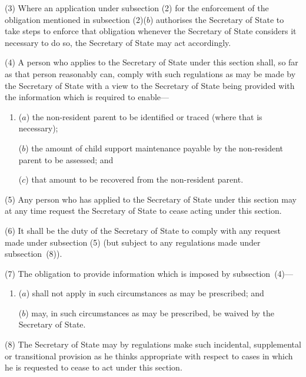 \documentclass[a4paper]{article}
\begin{document}
(3)
Where an application under subsection (2) for the enforcement of the
obligation mentioned in subsection (2)($b$) authorises the Secretary of State to take
steps to enforce that obligation whenever the Secretary of State considers it
necessary to do so, the Secretary of State may act accordingly.

(4)
A person who applies to the Secretary of State under this section shall, so
far as that person reasonably can, comply with such regulations as may be made
by the Secretary of State with a view to the Secretary of State being provided
with the information which is required to enable---

\begin{enumerate}\item[]
($a$)
the non-resident parent
to be identified or 
traced (where
that is necessary);

($b$)
the amount of child support maintenance payable by the non-resident parent
to be assessed; and

($c$)
that amount to be recovered from the non-resident parent.
\end{enumerate}

(5)
Any person who has applied to the Secretary of State under this section may
at any time request the Secretary of State to cease acting under this section.

(6)
It shall be the duty of the Secretary of State to comply with any request
made under subsection (5) (but subject to any regulations made under subsection~(8)).

(7)
The obligation to provide information which is imposed by subsection~(4)---
\begin{enumerate}\item[]
($a$)
shall not apply in such circumstances as may be prescribed; and

($b$)
may, in such circumstances as may be prescribed, be waived by the Secretary of State.
\end{enumerate}

(8)
The Secretary of State may by regulations make such incidental, supplemental or transitional provision as he thinks appropriate with respect to cases
in which he is requested to cease to act under this section.
\end{document}
